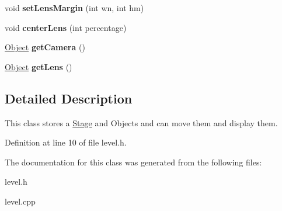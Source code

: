 \begin{DoxyCompactItemize}
void {\bfseries set\+Lens\+Margin} (int wn, int hm)
\item 
\mbox{\label{classLevel_ac39dbca241ee739f5f9c2a750c3750f4}} 
void {\bfseries center\+Lens} (int percentage)
\item 
\mbox{\label{classLevel_a11a17dbe04938950421d001a8f94cbbc}} 
\hyperlink{classObject}{Object} {\bfseries get\+Camera} ()
\item 
\mbox{\label{classLevel_a33bd74850ef322de8d76572f9fea312f}} 
\hyperlink{classObject}{Object} {\bfseries get\+Lens} ()
\end{DoxyCompactItemize}


\subsection{Detailed Description}
This class stores a \hyperlink{classStage}{Stage} and Objects and can move them and display them. 

Definition at line 10 of file level.\+h.



The documentation for this class was generated from the following files\+:\begin{DoxyCompactItemize}
\item 
level.\+h\item 
level.\+cpp\end{DoxyCompactItemize}

